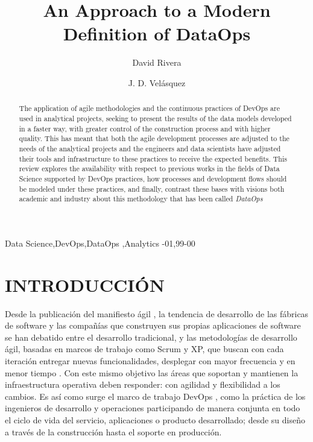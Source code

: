 \documentclass[review]{elsarticle}
\begin{document}
\begin{frontmatter}

\title{An Approach to a Modern Definition of DataOps}

\author[unal]{David Rivera}
   \author[unal]{J. D. Velásquez}

   \address[unal]{Universidad Nacional de Colombia, Sede Medellín, Colombia}


\begin{abstract}
The application of agile methodologies and the continuous practices of DevOps are used in analytical projects, seeking to present the results of the data models developed in a faster way, with greater control of the construction process and with higher quality. This has meant that both the agile development processes are adjusted to the needs of the analytical projects and the engineers and data scientists have adjusted their tools and infrastructure to these practices to receive the expected benefits. This review explores the availability with respect to previous works in the fields of Data Science supported by DevOps practices, how processes and development flows should be modeled under these practices, and finally, contrast these bases with visions both academic and industry about this methodology that has been called \textit{DataOps}\textit{}
\end{abstract}

\begin{keyword}
Data Science\sep DevOps\sep DataOps \sep Analytics
-01\sep  99-00
\end{keyword}

\end{frontmatter}

\linenumbers

\section{INTRODUCCIÓN}

Desde la publicación del manifiesto ágil  \cite{Beedle2001}, la tendencia de desarrollo de las fábricas de software y las compañías que construyen sus propias aplicaciones de software se han debatido entre el desarrollo tradicional, y las metodologías de desarrollo ágil, basadas en marcos de trabajo como Scrum y XP, que buscan con cada iteración entregar nuevas funcionalidades, desplegar con mayor frecuencia y en menor tiempo \cite{Szalvay2004}. Con este mismo objetivo las áreas que soportan y mantienen la infraestructura operativa deben responder: con agilidad y flexibilidad a los cambios. Es así como surge el marco de trabajo DevOps \cite{Humble}, como la práctica de los ingenieros de desarrollo y operaciones participando de manera conjunta \cite{Sacks2012} en todo el ciclo de vida del servicio, aplicaciones o producto desarrollado; desde su diseño a través de la construcción hasta el soporte en producción.
\end{document}
